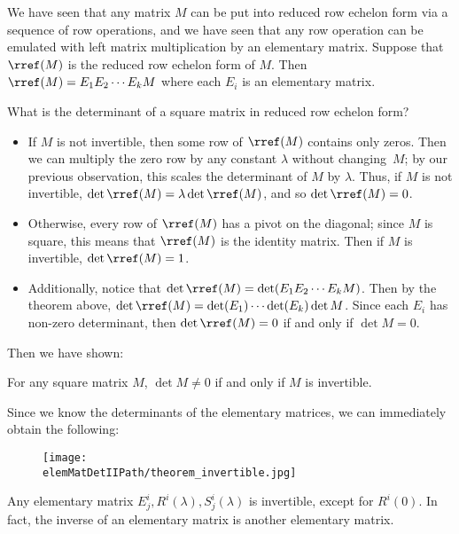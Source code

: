 We have seen that any matrix $M$ can be put into reduced row echelon form via a sequence of row operations, and we have seen that any row operation can be emulated with left matrix multiplication by an elementary matrix.  Suppose that $\rref(M)$ is the reduced row echelon form of $M$.  Then $\rref(M)=E_1E_2\cdots E_kM$ where each $E_i$ is an elementary matrix.

What is the determinant of a square matrix in reduced row echelon form?  
\begin{itemize}
\item If $M$ is not invertible, then some row of $\rref(M)$ contains only zeros.  Then we can multiply the zero row by any constant $\lambda$ without changing~$M$; by our previous observation, this scales the determinant of $M$ by $\lambda$.  Thus, if $M$ is not invertible, $\det \rref(M)=\lambda \det \rref(M)$, and so $\det \rref(M)=0$.  

\item Otherwise, every row of $\rref(M)$ has a pivot on the diagonal; since $M$ is square, this means that $\rref(M)$ is the identity matrix.  Then if $M$ is invertible, $\det \rref(M)=1$.

\item Additionally, notice that $\det \rref(M) = \det (E_1E_2\cdots E_kM)$.  Then by the theorem above, $\det \rref(M)=\det (E_1) \cdots \det (E_k) \det M$.  Since each $E_i$ has non-zero determinant, then $\det \rref(M)=0$ if and only if $\det M=0$.
\end{itemize}
Then we have shown:

\begin{theorem}
\label{detinvertible}
For any square matrix $M$, $\det M\neq 0$ if and only if $M$ is invertible.
\end{theorem}
Since we know the determinants of the elementary matrices, we can immediately obtain the following:



\begin{figure}
\begin{center}
\texttt{[image: \\elemMatDetIIPath/theorem\_invertible.jpg]}
\end{center}
\end{figure}

\begin{corollary}
Any elementary matrix $E^i_j, R^i(\lambda), S^i_j(\lambda)$ is invertible, except for $R^i(0)$.  In fact, the inverse of an elementary matrix is another elementary matrix.
\end{corollary}


